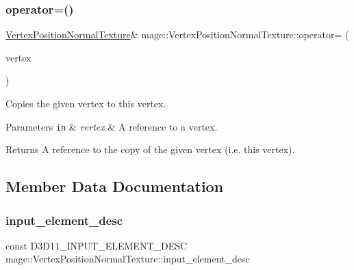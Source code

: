 \subsubsection{\texorpdfstring{operator=()}{operator=()}}
{\footnotesize\ttfamily \hyperlink{structmage_1_1_vertex_position_normal_texture}{Vertex\+Position\+Normal\+Texture}\& mage\+::\+Vertex\+Position\+Normal\+Texture\+::operator= (\begin{DoxyParamCaption}\item[{const \hyperlink{structmage_1_1_vertex_position_normal_texture}{Vertex\+Position\+Normal\+Texture} \&}]{vertex }\end{DoxyParamCaption})\hspace{0.3cm}{\ttfamily [default]}}

Copies the given vertex to this vertex.


\begin{DoxyParams}[1]{Parameters}
\mbox{\tt in}  & {\em vertex} & A reference to a vertex. \\
\hline
\end{DoxyParams}
\begin{DoxyReturn}{Returns}
A reference to the copy of the given vertex (i.\+e. this vertex). 
\end{DoxyReturn}


\subsection{Member Data Documentation}
\hypertarget{structmage_1_1_vertex_position_normal_texture_a4e6f650ee5968c6dc873e8e41dae5395}{}\label{structmage_1_1_vertex_position_normal_texture_a4e6f650ee5968c6dc873e8e41dae5395} 
\subsubsection{\texorpdfstring{input\+\_\+element\+\_\+desc}{input\_element\_desc}}
{\footnotesize\ttfamily const D3\+D11\+\_\+\+I\+N\+P\+U\+T\+\_\+\+E\+L\+E\+M\+E\+N\+T\+\_\+\+D\+E\+SC mage\+::\+Vertex\+Position\+Normal\+Texture\+::input\+\_\+element\+\_\+desc\hspace{0.3cm}{\ttfamily [static]}}

